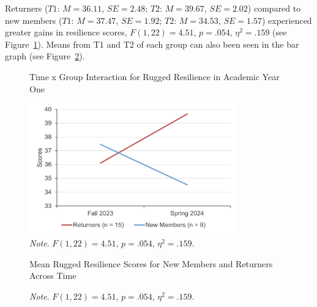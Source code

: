 Returners ($T1$: $M = 36.11$, $SE = 2.48$; $T2$: $M = 39.67$, $SE = 2.02$) compared to new members ($T1$: $M = 37.47$, $SE = 1.92$; $T2$: $M = 34.53$, $SE = 1.57$) experienced greater gains in resilience scores, $F(1, 22) = 4.51$, $p = .054$, $\eta^2 = .159$ (see Figure~\ref{fig:Interaction_RRM}). Means from T1 and T2 of each group can also been seen in the bar graph (see Figure~\ref{fig:Bar_RRM}).

\begin{figure}[H] 
\centering
\caption{\label{fig:Interaction_RRM} Time x Group Interaction for Rugged Resilience in Academic Year One}
\includegraphics[width=0.8\textwidth]{LaTeXFigure1.jpg}
\captionsetup{font=small}
    \caption*{\textit{Note}. $F(1, 22) = 4.51$, $p = .054$, $\eta^2 = .159$.}
\end{figure}

\begin{figure}[h!]
\centering
\caption{\label{fig:Bar_RRM} Mean Rugged Resilience Scores for New Members and Returners Across Time}
\captionsetup{font=small}
\caption*{\textit{Note}. $F(1, 22) = 4.51$, $p = .054$, $\eta^2 = .159$.}
\end{figure}
